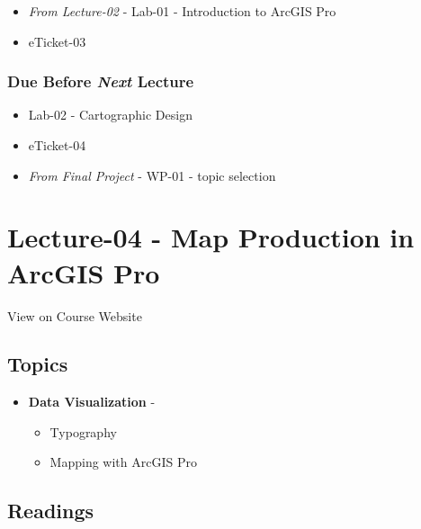 \documentclass[]{book}
\providecommand{\tightlist}{%
  \setlength{\itemsep}{0pt}\setlength{\parskip}{0pt}}
\begin{document}
\begin{itemize}
\tightlist
\item
  \emph{From Lecture-02} - Lab-01 - Introduction to ArcGIS Pro
\item
  eTicket-03
\end{itemize}

\hypertarget{due-before-next-lecture-1}{%
\subsubsection*{\texorpdfstring{Due Before \emph{Next} Lecture}{Due Before Next Lecture}}\label{due-before-next-lecture-1}}

\begin{itemize}
\tightlist
\item
  Lab-02 - Cartographic Design
\item
  eTicket-04
\item
  \emph{From Final Project} - WP-01 - topic selection
\end{itemize}

\hypertarget{lecture-04---map-production-in-arcgis-pro}{%
\section*{Lecture-04 - Map Production in ArcGIS Pro}\label{lecture-04---map-production-in-arcgis-pro}}

View on Course Website

\hypertarget{topics-4}{%
\subsection*{Topics}\label{topics-4}}

\begin{itemize}
\tightlist
\item
  \textbf{Data Visualization} -

  \begin{itemize}
  \tightlist
  \item
    Typography
  \item
    Mapping with ArcGIS Pro
  \end{itemize}
\end{itemize}

\hypertarget{readings-5}{%
\subsection*{Readings}\label{readings-5}}
\end{document}

